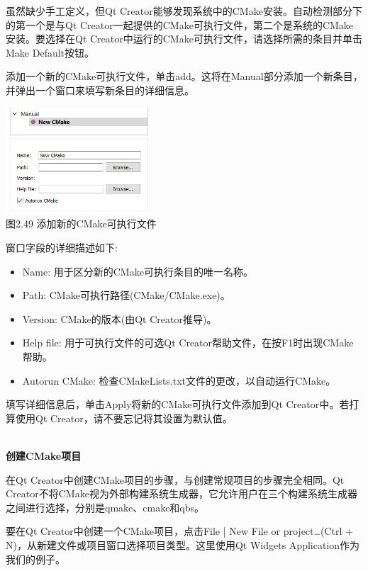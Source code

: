 虽然缺少手工定义，但Qt Creator能够发现系统中的CMake安装。自动检测部分下的第一个是与Qt Creator一起提供的CMake可执行文件，第二个是系统的CMake安装。要选择在Qt Creator中运行的CMake可执行文件，请选择所需的条目并单击Make Default按钮。

添加一个新的CMake可执行文件，单击add。这将在Manual部分添加一个新条目，并弹出一个窗口来填写新条目的详细信息。

\begin{center}
\includegraphics[width=0.4\textwidth]{content/1/chapter2/images/49.jpg}\\
图2.49 添加新的CMake可执行文件
\end{center}

窗口字段的详细描述如下:

\begin{itemize}
\item 
Name: 用于区分新的CMake可执行条目的唯一名称。

\item 
Path: CMake可执行路径(CMake/CMake.exe)。

\item 
Version: CMake的版本(由Qt Creator推导)。

\item 
Help file: 用于可执行文件的可选Qt Creator帮助文件，在按F1时出现CMake帮助。

\item 
Autorun CMake: 检查CMakeLists.txt文件的更改，以自动运行CMake。
\end{itemize}

填写详细信息后，单击Apply将新的CMake可执行文件添加到Qt Creator中。若打算使用Qt Creator，请不要忘记将其设置为默认值。

\hspace*{\fill} \\ %
\noindent
\textbf{创建CMake项目}

在Qt Creator中创建CMake项目的步骤，与创建常规项目的步骤完全相同。Qt Creator不将CMake视为外部构建系统生成器，它允许用户在三个构建系统生成器之间进行选择，分别是qmake、cmake和qbs。

要在Qt Creator中创建一个CMake项目，点击File | New File or project…(Ctrl + N)，从新建文件或项目窗口选择项目类型。这里使用Qt Widgets Application作为我们的例子。

